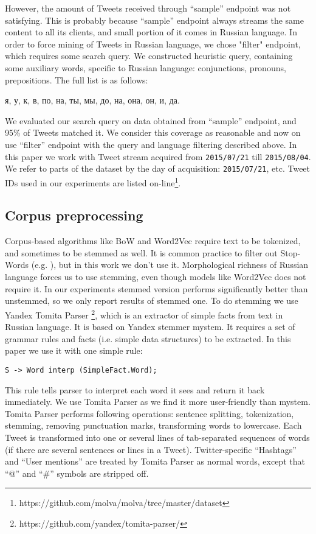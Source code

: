 \documentclass{llncs}
\begin{document}
However, the amount of Tweets received through “sample” endpoint was not satisfying. This is probably because “sample” endpoint always streams the same content to all its clients, and small portion of it comes in Russian language. In order to force mining of Tweets in Russian language, we chose "filter" endpoint, which requires some search query. We constructed heuristic query, containing some auxiliary words, specific to Russian language: conjunctions, pronouns, prepositions. The full list is as follows: 

\foreignlanguage{russian}{
я, у, к, в, по, на, ты, мы, до, на, она, он, и, да. }

We evaluated our search query on data obtained from “sample” endpoint, and 95\% of Tweets matched it. We consider this coverage as reasonable and now on use “filter” endpoint with the query and language filtering described above. In this paper we work with Tweet stream acquired from {\tt2015/07/21} till {\tt2015/08/04}. We refer to parts of the dataset by the day of acquisition: {\tt2015/07/21}, etc. Tweet IDs used in our experiments are listed on-line\footnote{https://github.com/molva/molva/tree/master/dataset}.
%
\subsection{Corpus preprocessing}
%
Corpus-based algorithms like BoW and Word2Vec require text to be tokenized, and sometimes to be stemmed as well. It is common practice to filter out Stop-Words (e.g. \cite{Kutuzov}), but in this work we don’t use it. Morphological richness of Russian language forces us to use stemming, even though models like Word2Vec does not require it. In our experiments stemmed version performs significantly better than unstemmed, so we only report results of stemmed one. To do stemming we use Yandex Tomita Parser \footnote{https://github.com/yandex/tomita-parser/}, which is an extractor of simple facts from text in Russian language. It is based on Yandex stemmer mystem\cite{Segalovich}. It requires a set of grammar rules and facts (i.e. simple data structures) to be extracted. In this paper we use it with one simple rule:
\begin{lstlisting}
S -> Word interp (SimpleFact.Word); 
\end{lstlisting}
This rule tells parser to interpret each word it sees and return it back immediately. We use Tomita Parser as we find it more user-friendly than mystem. Tomita Parser performs following operations: sentence splitting, tokenization, stemming, removing punctuation marks, transforming words to lowercase. Each Tweet is transformed into one or several lines of tab-separated sequences of words (if there are several sentences or lines in a Tweet).  Twitter-specific “Hashtags” and “User mentions” are treated by Tomita Parser as normal words, except that “@” and “\#” symbols are stripped off.
\end{document}

